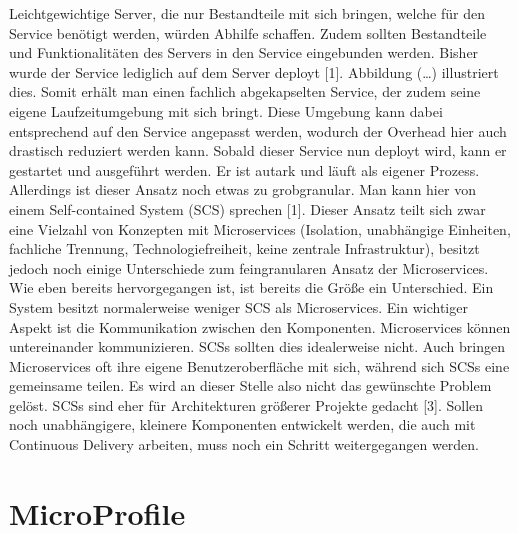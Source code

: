 Leichtgewichtige Server, die nur Bestandteile mit sich bringen, welche für den Service benötigt werden, würden Abhilfe schaffen. Zudem sollten Bestandteile und Funktionalitäten des Servers in den Service eingebunden werden. Bisher wurde der Service lediglich auf dem Server deployt [1]. Abbildung (…) illustriert dies. Somit erhält man einen fachlich abgekapselten Service, der zudem seine eigene Laufzeitumgebung mit sich bringt. Diese Umgebung kann dabei entsprechend auf den Service angepasst werden, wodurch der Overhead hier auch drastisch reduziert werden kann. Sobald dieser Service nun deployt wird, kann er gestartet und ausgeführt werden. Er ist autark und läuft als eigener Prozess. Allerdings ist dieser Ansatz noch etwas zu grobgranular. Man kann hier von einem Self-contained System (SCS) sprechen [1]. Dieser Ansatz teilt sich zwar eine Vielzahl von Konzepten mit Microservices (Isolation, unabhängige Einheiten, fachliche Trennung, Technologiefreiheit, keine zentrale Infrastruktur), besitzt jedoch noch einige Unterschiede zum feingranularen Ansatz der Microservices. Wie eben bereits hervorgegangen ist, ist bereits die Größe ein Unterschied. Ein System besitzt normalerweise weniger SCS als Microservices. Ein wichtiger Aspekt ist die Kommunikation zwischen den Komponenten. Microservices können untereinander kommunizieren. SCSs sollten dies idealerweise nicht. Auch bringen Microservices oft ihre eigene Benutzeroberfläche mit sich, während sich SCSs eine gemeinsame teilen. Es wird an dieser Stelle also nicht das gewünschte Problem gelöst. SCSs sind eher für Architekturen größerer Projekte gedacht [3]. Sollen noch unabhängigere, kleinere Komponenten entwickelt werden, die auch mit Continuous Delivery arbeiten, muss noch ein Schritt weitergegangen werden. 

\section{MicroProfile}